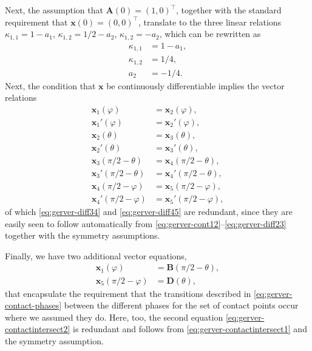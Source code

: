 \documentclass[11pt]{article}
\begin{document}
Next, the assumption that $\mathbf{A}(0)=(1,0)^\top$, together with the standard requirement that $\mathbf{x}(0)=(0,0)^\top$, translate to the three linear relations
$\kappa_{1,1} = 1-a_1$, $\kappa_{1,2} = 1/2-a_2$, $\kappa_{1,2} = -a_2$, which can be rewritten as
\begin{align}
\kappa_{1,1} &= 1-a_1, \label{eq:gerverxA-time0-exp1} \\
\kappa_{1,2} &= 1/4, \label{eq:gerverxA-time0-exp2} \\
a_2 &= -1/4. \label{eq:gerverxA-time0-exp3}
\end{align}
Next, the condition that $\mathbf{x}$ be continuously differentiable implies the vector relations
\begin{align}
\mathbf{x}_1(\varphi) &= \mathbf{x}_2(\varphi), \label{eq:gerver-cont12} \\
\mathbf{x}_1'(\varphi) &= \mathbf{x}_2'(\varphi), \label{eq:gerver-diff12} \\
\mathbf{x}_2(\theta) &= \mathbf{x}_3(\theta), \label{eq:gerver-cont23} \\
\mathbf{x}_2'(\theta) &= \mathbf{x}_3'(\theta), \label{eq:gerver-diff23} \\
\mathbf{x}_3(\pi/2-\theta) &= \mathbf{x}_4(\pi/2-\theta), \label{eq:gerver-cont34} \\
\mathbf{x}_3'(\pi/2-\theta) &= \mathbf{x}_4'(\pi/2-\theta), \label{eq:gerver-diff34} \\
\mathbf{x}_4(\pi/2-\varphi) &= \mathbf{x}_5(\pi/2-\varphi), \label{eq:gerver-cont45} \\
\mathbf{x}_4'(\pi/2-\varphi) &= \mathbf{x}_5'(\pi/2-\varphi), \label{eq:gerver-diff45}
\end{align}
of which \eqref{eq:gerver-diff34} and \eqref{eq:gerver-diff45} are redundant, since they are easily seen to follow automatically from \eqref{eq:gerver-cont12}--\eqref{eq:gerver-diff23} together with the symmetry assumptions.

Finally, we have two additional vector equations,
\begin{align}
\mathbf{x}_1(\varphi) &= \mathbf{B}(\pi/2-\theta), \label{eq:gerver-contactintersect1} \\
\mathbf{x}_5(\pi/2-\varphi) &= \mathbf{D}(\theta), \label{eq:gerver-contactintersect2}
\end{align}
that encapsulate the requirement that the transitions described in \eqref{eq:gerver-contact-phases} between the different phases for the set of contact points  occur where we assumed they do. Here, too, the second equation \eqref{eq:gerver-contactintersect2} is redundant and follows from \eqref{eq:gerver-contactintersect1} and the symmetry assumption.
\end{document}
